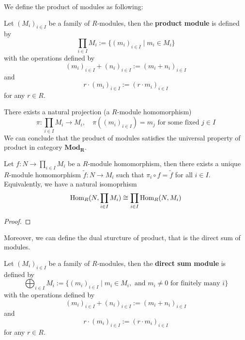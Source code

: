 \documentclass[12pt,a4paper]{article}
\begin{document}
We define the product of modules as following:
\begin{definitionplain}
    Let \((M_i)_{i \in I}\) be a family of \(R\)-modules, then the \textbf{product module} is defined by
    \[\prod_{i \in I} M_i := \{(m_i)_{i \in I} \mid m_i \in M_i\}\]
    with the operations defined by
    \[(m_i)_{i \in I} + (n_i)_{i \in I} := (m_i + n_i)_{i \in I}\]
    and
    \[r \cdot (m_i)_{i \in I} := (r \cdot m_i)_{i \in I}\]
    for any \(r \in R\).\\
\end{definitionplain}
    There exists a natural projection (a \(R\)-module homomorphism) \[\pi: \prod_{i \in I} M_i \to M_i, \quad \pi((m_i)_{i \in I}) = m_j \text{ for some fixed } j \in I\]
    We can conclude that the product of modules satisfies the universal property of product in category \(\mathbf{Mod_R}\).
    \begin{proposition}
        Let \(f: N \to \prod_{i \in I} M_i\) be a \(R\)-module homomorphism, then there exists a unique \(R\)-module homomorphism \(\tilde{f}: N \to M_i\) such that \(\pi_i \circ f = \tilde{f}\) for all \(i \in I\). Equivalently, we have a natural isomoprhism
        \[\operatorname{Hom}_R(N, \prod_{i \in I} M_i) \cong \prod_{i \in I} \operatorname{Hom}_R(N, M_i)\]
    \end{proposition}
    \begin{proof}
        
    \end{proof}

    Moreover, we can define the dual sturcture of product, that is the direct sum of modules.
    \begin{definitionplain}
        Let \((M_i)_{i \in I}\) be a family of \(R\)-modules, then the \textbf{direct sum module} is defined by
        \[\bigoplus_{i \in I} M_i := \{(m_i)_{i \in I} \mid m_i \in M_i, \text{ and } m_i \neq 0 \text{ for finitely many } i\}\]
        with the operations defined by
        \[(m_i)_{i \in I} + (n_i)_{i \in I} := (m_i + n_i)_{i \in I}\]
        and
        \[r \cdot (m_i)_{i \in I} := (r \cdot m_i)_{i \in I}\]
        for any \(r \in R\).\\
    \end{definitionplain}
\end{document}
